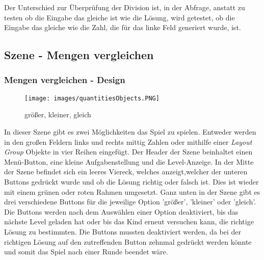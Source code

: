 Der Unterschied zur Überprüfung der Division ist, in der Abfrage, anstatt zu testen ob die Eingabe das gleiche ist wie die Lösung, wird getestet, ob die Eingabe das gleiche wie die Zahl, die für das linke Feld generiert wurde, ist.
\subsection{Szene - Mengen vergleichen}
\subsubsection{Mengen vergleichen - Design}
\begin{figure}[htbp]
  \centering
  \texttt{[image: images/quantitiesObjects.PNG]}
  \caption{größer, kleiner, gleich}
  \label{quantities}
\end{figure}
In dieser Szene gibt es zwei Möglichkeiten das Spiel zu spielen. Entweder werden in den großen Feldern links und rechts mittig Zahlen oder mithilfe einer \textit{Layout Group} Objekte in vier Reihen eingefügt. Der Header der Szene beinhaltet einen Menü-Button, eine kleine Aufgabenstellung und die Level-Anzeige. In der Mitte der Szene befindet sich ein leeres Viereck, welches anzeigt,welcher der unteren Buttons gedrückt wurde und ob die Lösung richtig oder falsch ist. Dies ist wieder mit einem grünen oder roten Rahmen umgesetzt. Ganz unten in der Szene gibt es drei verschiedene Buttons für die jeweilige Option 'größer', 'kleiner' oder 'gleich'. Die Buttons werden nach dem Auswählen einer Option deaktiviert, bis das nächste Level geladen hat oder bis das Kind erneut versuchen kann, die richtige Lösung zu bestimmten. Die Buttons mussten deaktiviert werden, da bei der richtigen Lösung auf den zutreffenden Button zehnmal gedrückt werden könnte und somit das Spiel nach einer Runde beendet wäre.\\
